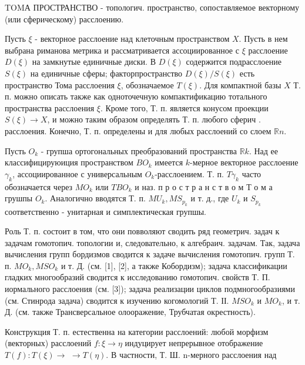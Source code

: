 \documentclass[10pt]{article}
\begin{document}
TOMА ПРОСТРАНСТВО - топологич. пространство, сопоставляемое векторному (или сферическому) расслоению.



Пусть $\xi$ - векторное расслоение над клеточным пространством $X$. Пусть в нем выбрана риманова метрика и рассматривается ассоциированное с $\xi$ расслоение $D(\xi)$ на замкнутые единичные диски. В $D(\xi)$ содержится подрасслоение $S(\xi)$ на единичные сферы; факторпространство $D(\xi) / S(\xi)$ есть пространство Тома расслоения $\xi$, обозначаемое $T(\xi)$. Для компактной базы $X$ Т. п. можно описать также как одноточечную компактификацию тотального пространства расслоения $\xi$. Кроме того, Т. п. является конусом проекции $S(\xi) \rightarrow X$, и можно таким образом определять Т. п. любого сферич . расслоения. Конечно, Т. п. определены и для любых расслоений со слоем $\mathbb{R} n$.



Пусть $O_{k}$ - групша ортогональных преобразований пространства $\mathbb{R} k$. Над ее классифицируюиция пространством $B O_{k}$ имеется $k$-мерное векторное расслоение $\gamma_{k}$, ассоциированное с универсальным $O_{k}$-расслоением. Т. п. $T \gamma_{k}$ часто обозначается через $M O_{k}$ или $T B O_{k}$ и наз. п р о с т р а н с т в о м Т о м а грушпы $O_{k}$. Аналогично вводятся Т. п. $M U_{k}, M S_{p_{k}}$ и т. д., где $U_{k}$ и $S_{p_{k}}$ соответственно - унитарная и симплектическая групшы.



Роль Т. п. состоит в том, что они повволяют сводить ряд геометрич. задач к задачам гомотопич. топологии и, следовательно, к алгебраич. задачам. Так, задача вычисления групп бордизмов сводится к задаче вычисления гомотопич. групп Т. п. $M O_{k}, M S O_{k}$ и т. Д. (см. [1], [2], а также Кобордизм); задача классификации гладких многообразий сводится к исследованию гомотопич. свойств Т. П. иормального расслоения (см. [3]); задача реализации циклов подмногообразиями (см. Стинрода задача) сводится к изучению когомологий Т. ІІ. $M S O_{k}$ и $M O_{k}$, и т. Д. (см. также Трансверсальное олооражение, Трубчатая окрестность).



Конструкция Т. п. естественна на категории расслоений: любой морфизм (векторных) расслоений $f: \xi \rightarrow \eta$ индуцирует непрерывное отображение $T(f): T(\xi) \rightarrow$ $\rightarrow T(\eta)$. В частности, Т. Ш. n-мерного расслоения над
\end{document}
